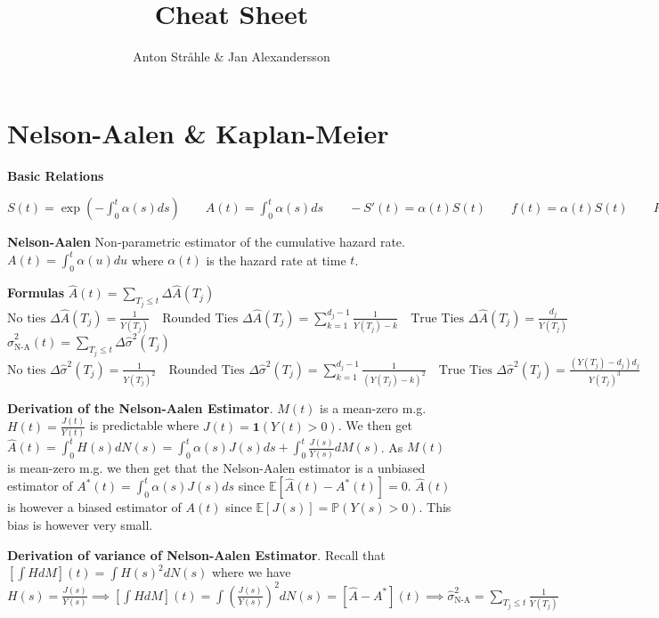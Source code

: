 \documentclass{article}
\title{Cheat Sheet}
\author{Anton Stråhle \& Jan Alexandersson}
\begin{document}
\section*{Nelson-Aalen \& Kaplan-Meier}

\textbf{Basic Relations}

$S(t) = \exp(-\int_0^t \alpha(s)ds) \qquad A(t) = \int_0^t \alpha(s)ds \qquad -S'(t) = \alpha(t)S(t) \qquad f(t)=\alpha(t) S(t) \qquad P(T>x | T>y) = \frac{P(T>x)}{P(T>y)} = \frac{S(x)}{S(y)}$ 

\medskip

\textbf{Nelson-Aalen} Non-parametric estimator of the cumulative hazard rate. $A(t) = \int_0^t \alpha(u) du$ where $\alpha(t)$ is the hazard rate at time $t$. 

\medskip

\textbf{Formulas} $ \hat{A}(t) = \sum_{T_j \leq t} \Delta \hat{A}(T_j)$ \newline
$
\text{No ties } \Delta \hat{A}(T_j) = \frac{1}{Y(T_j)} \quad
\text{Rounded Ties } \Delta \hat{A}(T_j) = \sum_{k=1}^{d_j -1}\frac{1}{Y(T_j) - k} \quad
\text{True Ties } \Delta \hat{A}(T_j) = \frac{d_j}{Y(T_j)} $ \newline $
\hat\sigma^2_{\text{N-A}}(t) = \sum_{T_j \leq t} \Delta \hat\sigma^2(T_j) $\newline 
$
\text{No ties } \Delta \hat\sigma^2(T_j) = \frac{1}{Y(T_j)^2} \quad
\text{Rounded Ties } \Delta \hat\sigma^2(T_j) = \sum_{k=1}^{d_j -1}\frac{1}{(Y(T_j) - k)^2} \quad
\text{True Ties } \Delta \hat\sigma^2(T_j) = \frac{(Y(T_j)-d_j)d_j}{Y(T_j)^3}$

\medskip


\textbf{Derivation of the Nelson-Aalen Estimator}. $M(t)$ is a mean-zero m.g. $H(t) = \frac{J(t)}{Y(t)}$ is predictable where $J(t) = \mathbf{1}(Y(t) > 0)$. We then get $\hat{A}(t) = \int_0^t H(s)dN(s) = \int_0^t\alpha(s)J(s)ds + \int_0^t \frac{J(s)}{Y(s)}dM(s)$. As $M(t)$ is mean-zero m.g. we then get that the Nelson-Aalen estimator is a unbiased estimator of $A^*(t) = \int_0^t \alpha(s)J(s)ds $ since $\mathbb{E}\left[\hat{A}(t) - A^*(t)\right] = 0$. $\hat{A}(t)$ is however a biased estimator of $A(t)$ since $\mathbb{E}[J(s)] = \mathbb{P}(Y(s) > 0)$. This bias is however very small.

\medskip


\textbf{Derivation of variance of Nelson-Aalen Estimator}. Recall that $\left[\int HdM\right](t) = \int H(s)^2dN(s)$ where we have $H(s) = \frac{J(s)}{Y(s)} \implies \left[\int HdM\right](t) = \int \left(\frac{J(s)}{Y(s)}\right)^2dN(s) = [\hat{A} - A^*](t) \implies \hat\sigma^2_{\text{N-A}} = \sum_{T_j \leq t} \frac{1}{Y(T_j)}$ 
\end{document}

